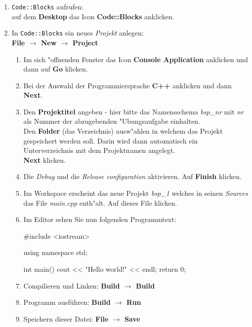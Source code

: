 \begin{enumerate}
 \item \texttt{Code::Blocks} aufrufen: \\
   auf dem \textbf{Desktop} das Icon \textbf{Code::Blocks} anklicken.
 \item In \texttt{Code::Blocks} ein neues \emph{Projekt} anlegen: \\
   \textbf{File $\longrightarrow$ New $\longrightarrow$ Project}
   \begin{enumerate}
     \item Im sich "offnenden Fenster das Icon  \textbf{Console Application} anklicken und
        dann auf \textbf{Go} klicken.
     \item Bei der Auswahl der Programmiersprache \textbf{C++} anklicken und dann \textbf{Next}.
     \item Den \textbf{Projektitel} angeben - hier bitte das Namensschema \emph{bsp\_nr} mit
          \emph{nr} als Nummer der abzugebenden "Ubungsaufgabe einhalten. \\
          Den \textbf{Folder} (das Verzeichnis) ausw"ahlen in welchem das Projekt gespeichert
          werden soll. Darin wird dann automatisch ein Unterverzeichnis mit dem Projektnamen angelegt.
          \\  \textbf{Next} klicken.
     \item Die \emph{Debug} und die \emph{Release configuration} aktivieren.
           Auf \textbf{Finish} klicken.
     \item Im Workspace erscheint das neue Projekt \emph{bsp\_1} welches in seinen
          \emph{Sources} das File \emph{main.cpp} enth"alt.
           Auf dieses File klicken.
     \item Im Editor sehen Sie nun folgenden Programmtext: \\
\begin{minipage}{0.5\textwidth}
%
{\scriptsize
\begin{boxedverbatim}
#include <iostream>

using namespace std;

int main()
{
    cout << "Hello world!" << endl;
    return 0;
}
\end{boxedverbatim}
}
%
\end{minipage}
  \item Compilieren und Linken: \textbf{Build $\longrightarrow$ Build}
  \item Programm ausführen: \textbf{Build $\longrightarrow$ Run}
  \item Speichern dieser Datei: \textbf{File $\longrightarrow$ Save}
   \end{enumerate}
\end{enumerate}

